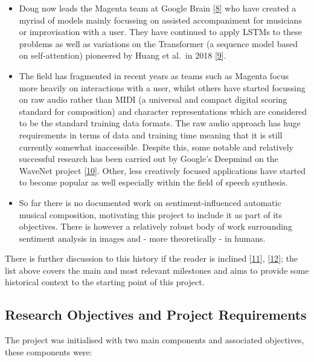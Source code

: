 \documentclass[12pt,]{article}
\begin{document}
\begin{itemize}
\item
  Doug now leads the Magenta team at Google Brain
  {[}\protect\hyperlink{ref-magenta}{8}{]} who have created a myriad of
  models mainly focussing on assisted accompaniment for musicians or
  improvisation with a user. They have continued to apply LSTMs to these
  problems as well as variations on the Transformer (a sequence model
  based on self-attention) pioneered by Huang et al.~in 2018
  {[}\protect\hyperlink{ref-huang2018improved}{9}{]}.
\item
  The field has fragmented in recent years as teams such as Magenta
  focus more heavily on interactions with a user, whilst others have
  started focussing on raw audio rather than MIDI (a universal and
  compact digital scoring standard for composition) and character
  representations which are considered to be the standard training data
  formats. The raw audio approach has huge requirements in terms of data
  and training time meaning that it is still currently somewhat
  inaccessible. Despite this, some notable and relatively successful
  research has been carried out by Google's Deepmind on the WaveNet
  project {[}\protect\hyperlink{ref-oord2016wavenet}{10}{]}. Other, less
  creatively focused applications have started to become popular as well
  especially within the field of speech synthesis.
\item
  So far there is no documented work on sentiment-influenced automatic
  musical composition, motivating this project to include it as part of
  its objectives. There is however a relatively robust body of work
  surrounding sentiment analysis in images and - more theoretically - in
  humans.
\end{itemize}

There is further discussion to this history if the reader is inclined
{[}\protect\hyperlink{ref-mediumkylemcdonald}{11}{]},
{[}\protect\hyperlink{ref-libdlmusic}{12}{]}; the list above covers the
main and most relevant milestones and aims to provide some historical
context to the starting point of this project.

\hypertarget{research-objectives-and-project-requirements}{%
\subsection{Research Objectives and Project
Requirements}\label{research-objectives-and-project-requirements}}

The project was initialised with two main components and associated
objectives, these components were:
\end{document}

